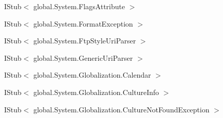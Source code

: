 \begin{DoxyCompactList}
\begin{DoxyCompactList}
\end{DoxyCompactList}
\item I\-Stub$<$ global.\-System.\-Flags\-Attribute $>$\begin{DoxyCompactList}
\item {}
\end{DoxyCompactList}
\item I\-Stub$<$ global.\-System.\-Format\-Exception $>$\begin{DoxyCompactList}
\item {}
\end{DoxyCompactList}
\item I\-Stub$<$ global.\-System.\-Ftp\-Style\-Uri\-Parser $>$\begin{DoxyCompactList}
\item {}
\end{DoxyCompactList}
\item I\-Stub$<$ global.\-System.\-Generic\-Uri\-Parser $>$\begin{DoxyCompactList}
\item {}
\end{DoxyCompactList}
\item I\-Stub$<$ global.\-System.\-Globalization.\-Calendar $>$\begin{DoxyCompactList}
\item {}
\end{DoxyCompactList}
\item I\-Stub$<$ global.\-System.\-Globalization.\-Culture\-Info $>$\begin{DoxyCompactList}
\item {}
\end{DoxyCompactList}
\item I\-Stub$<$ global.\-System.\-Globalization.\-Culture\-Not\-Found\-Exception $>$\begin{DoxyCompactList}

\end{DoxyCompactList}
\end{DoxyCompactList}
